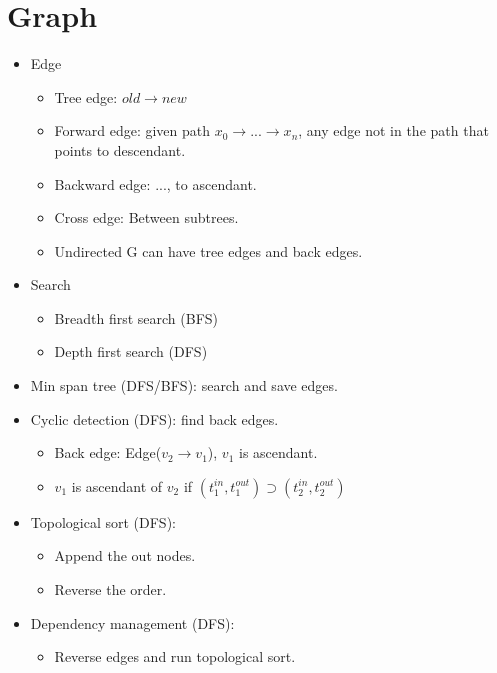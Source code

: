 \documentclass[twocolumn]{article}
\begin{document}

\section{Graph}
\begin{itemize}
\item Edge
  \begin{itemize}
  \item Tree edge: $old \rightarrow new$
  \item Forward edge: given path $x_0 \rightarrow ... \rightarrow x_n$, any edge not in the path that points to descendant.
  \item Backward edge: ..., to ascendant.
  \item Cross edge: Between subtrees.
  \item Undirected G can have tree edges and back edges.
  \end{itemize}
\item Search
  \begin{itemize}
  \item Breadth first search (BFS)
  \item Depth first search (DFS)
  \end{itemize}
\item Min span tree (DFS/BFS): search and save edges.
\item Cyclic detection (DFS): find back edges.
  \begin{itemize}
  \item Back edge: Edge($v_2 \rightarrow v_1$), $v_1$ is ascendant.
  \item $v_1$ is ascendant of $v_2$ if $(t_1^{in}, t_1^{out}) \supset (t_2^{in}, t_2^{out})$
  \end{itemize}
\item Topological sort (DFS):
  \begin{itemize}
  \item Append the out nodes.
  \item Reverse the order.
  \end{itemize}
\item Dependency management (DFS):
  \begin{itemize}
  \item Reverse edges and run topological sort.
  \end{itemize}
\end{itemize}

\end{document}
